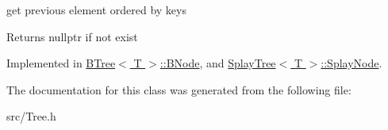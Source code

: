 get previous element ordered by keys 

\begin{DoxyReturn}{Returns}
nullptr if not exist 
\end{DoxyReturn}


Implemented in \hyperlink{classBTree_1_1BNode_aa3909dab0e45cf56b602705b8720e7c0}{B\+Tree$<$ T $>$\+::\+B\+Node}, and \hyperlink{classSplayTree_1_1SplayNode_a6a89136b18f560485a4bda43ef15f560}{Splay\+Tree$<$ T $>$\+::\+Splay\+Node}.



The documentation for this class was generated from the following file\+:\begin{DoxyCompactItemize}
\item 
src/Tree.\+h\end{DoxyCompactItemize}
